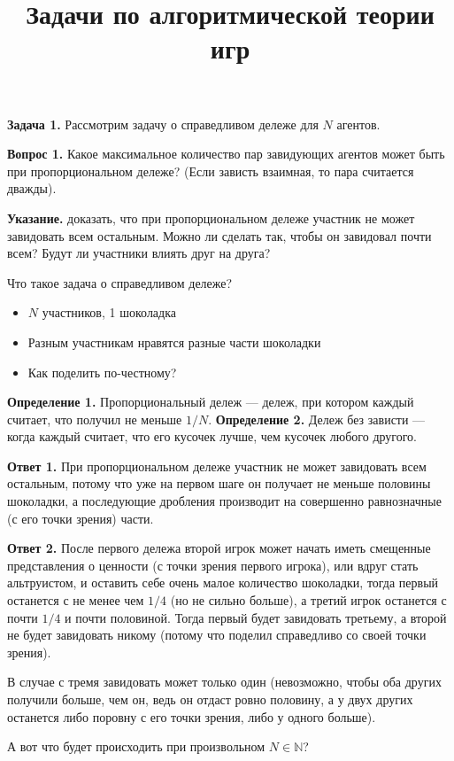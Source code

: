 \documentclass[]{article}
\title{Задачи по алгоритмической теории игр}
\newcommand{\task}[1]{\textbf{Задача #1. }}
\begin{document}
\maketitle

\task{1}
Рассмотрим задачу о справедливом дележе для $N$ агентов.

\textbf{Вопрос 1.} Какое максимальное количество пар завидующих агентов может быть при пропорциональном дележе? (Если зависть взаимная, то пара считается дважды).

\textbf{Указание.} доказать, что при пропорциональном дележе участник не может завидовать всем остальным. Можно ли сделать так, чтобы он завидовал почти всем? Будут ли участники влиять друг на друга?

Что такое задача о справедливом дележе? \cite{gm}

\begin{itemize}
\item $N$ участников, 1 шоколадка
\item Разным участникам нравятся разные части шоколадки 
\item Как поделить по-честному?
\end{itemize}

\textbf{Определение 1.} Пропорциональный дележ --- дележ, при котором каждый считает, что получил не меньше $1/N$. 
\textbf{Определение 2.} Дележ без зависти --- когда каждый считает, что его кусочек лучше, чем кусочек любого другого.

\textbf{Ответ 1.} При пропорциональном дележе участник не может завидовать всем остальным, потому что уже на первом шаге он получает не меньше половины шоколадки, а последующие дробления производит на совершенно равнозначные (с его точки зрения) части.

\textbf{Ответ 2.} После первого дележа второй игрок может начать иметь смещенные представления о ценности (с точки зрения первого игрока), или вдруг стать альтруистом, и оставить себе очень малое количество шоколадки, тогда первый останется с не менее чем $1/4$ (но не сильно больше), а третий игрок останется с почти $1/4$ и почти половиной. Тогда первый будет завидовать третьему, а второй не будет завидовать никому (потому что поделил справедливо со своей точки зрения).

В случае с тремя завидовать может только один (невозможно, чтобы оба других получили больше, чем он, ведь он отдаст ровно половину, а у двух других останется либо поровну с его точки зрения, либо у одного больше).

А вот что будет происходить при произвольном $N\in\mathbb{N}$?
\end{document}
